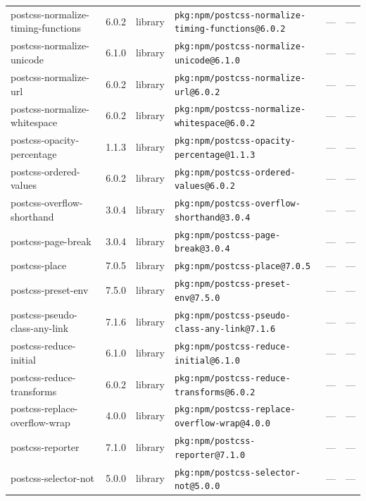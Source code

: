 \documentclass[11pt,a4paper]{article}
\begin{document}
\begin{longtable}{|p{4cm}|p{2cm}|p{1.6cm}|p{5cm}|p{1.5cm}|p{3.5cm}|}
\raggedright postcss-normalize-timing-functions & 6.0.2 & library & \small\texttt{pkg:npm/postcss-normalize-timing-functions@6.0.2} & — & \small — \\
\raggedright postcss-normalize-unicode & 6.1.0 & library & \small\texttt{pkg:npm/postcss-normalize-unicode@6.1.0} & — & \small — \\
\raggedright postcss-normalize-url & 6.0.2 & library & \small\texttt{pkg:npm/postcss-normalize-url@6.0.2} & — & \small — \\
\raggedright postcss-normalize-whitespace & 6.0.2 & library & \small\texttt{pkg:npm/postcss-normalize-whitespace@6.0.2} & — & \small — \\
\raggedright postcss-opacity-percentage & 1.1.3 & library & \small\texttt{pkg:npm/postcss-opacity-percentage@1.1.3} & — & \small — \\
\raggedright postcss-ordered-values & 6.0.2 & library & \small\texttt{pkg:npm/postcss-ordered-values@6.0.2} & — & \small — \\
\raggedright postcss-overflow-shorthand & 3.0.4 & library & \small\texttt{pkg:npm/postcss-overflow-shorthand@3.0.4} & — & \small — \\
\raggedright postcss-page-break & 3.0.4 & library & \small\texttt{pkg:npm/postcss-page-break@3.0.4} & — & \small — \\
\raggedright postcss-place & 7.0.5 & library & \small\texttt{pkg:npm/postcss-place@7.0.5} & — & \small — \\
\raggedright postcss-preset-env & 7.5.0 & library & \small\texttt{pkg:npm/postcss-preset-env@7.5.0} & — & \small — \\
\raggedright postcss-pseudo-class-any-link & 7.1.6 & library & \small\texttt{pkg:npm/postcss-pseudo-class-any-link@7.1.6} & — & \small — \\
\raggedright postcss-reduce-initial & 6.1.0 & library & \small\texttt{pkg:npm/postcss-reduce-initial@6.1.0} & — & \small — \\
\raggedright postcss-reduce-transforms & 6.0.2 & library & \small\texttt{pkg:npm/postcss-reduce-transforms@6.0.2} & — & \small — \\
\raggedright postcss-replace-overflow-wrap & 4.0.0 & library & \small\texttt{pkg:npm/postcss-replace-overflow-wrap@4.0.0} & — & \small — \\
\raggedright postcss-reporter & 7.1.0 & library & \small\texttt{pkg:npm/postcss-reporter@7.1.0} & — & \small — \\
\raggedright postcss-selector-not & 5.0.0 & library & \small\texttt{pkg:npm/postcss-selector-not@5.0.0} & — & \small — \\

\end{longtable}
\end{document}
